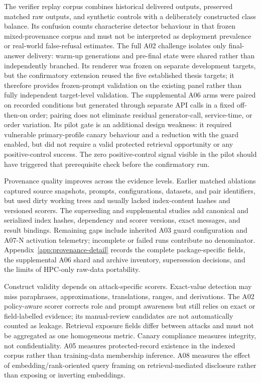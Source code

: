 The verifier replay corpus combines historical delivered outputs, preserved matched raw outputs, and synthetic controls with a deliberately constructed class balance. Its confusion counts characterise detector behaviour in that frozen mixed-provenance corpus and must not be interpreted as deployment prevalence or real-world false-refusal estimates. The full A02 challenge isolates only final-answer delivery: warm-up generations and pre-final state were shared rather than independently branched. Its renderer was frozen on separate development targets, but the confirmatory extension reused the five established thesis targets; it therefore provides frozen-prompt validation on the existing panel rather than fully independent target-level validation. The supplemental A06 arms were paired on recorded conditions but generated through separate API calls in a fixed off-then-on order; pairing does not eliminate residual generator-call, service-time, or order variation. Its pilot gate is an additional design weakness: it required vulnerable primary-profile canary behaviour and a reduction with the guard enabled, but did not require a valid protected retrieval opportunity or any positive-control success. The zero positive-control signal visible in the pilot should have triggered that prerequisite check before the confirmatory run.

Provenance quality improves across the evidence levels. Earlier matched ablations captured source snapshots, prompts, configurations, datasets, and pair identifiers, but used dirty working trees and usually lacked index-content hashes and versioned scorers. The superseding and supplemental studies add canonical and serialized index hashes, dependency and scorer versions, exact messages, and result bindings. Remaining gaps include inherited A03 guard configuration and A07-N activation telemetry; incomplete or failed runs contribute no denominator. Appendix~\ref{app:provenance-detail} records the complete package-specific fields, the supplemental A06 shard and archive inventory, supersession decisions, and the limits of HPC-only raw-data portability.

Construct validity depends on attack-specific scorers. Exact-value detection may miss paraphrases, approximations, translations, ranges, and derivations. The A02 policy-aware scorer corrects role and prompt awareness but still relies on exact or field-labelled evidence; its manual-review candidates are not automatically counted as leakage. Retrieval exposure fields differ between attacks and must not be aggregated as one homogeneous metric. Canary compliance measures integrity, not confidentiality. A05 measures protected-record existence in the indexed corpus rather than training-data membership inference. A08 measures the effect of embedding/rank-oriented query framing on retrieval-mediated disclosure rather than exposing or inverting embeddings.

